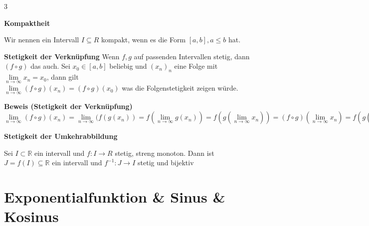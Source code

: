 \documentclass[25pt]{sciposter}
\newcommand{\R}{\mathbb{R}}
\newenvironment{method}[1]{\begin{mdframed}[backgroundcolor=blue!10,innertopmargin=15pt, innerbottommargin=15pt, nobreak=true]
		\textbf{#1 }
	}
	{ 
	\end{mdframed}
}
\begin{document}
\begin{multicols}{3}
\begin{method}{Kompaktheit}
	Wir nennen ein Intervall $I \subseteq R$ kompakt, wenn es die Form $[a,b], a \leq b$ hat.
\end{method}


\begin{method}{Stetigkeit der Verknüpfung} Wenn $f,g$ auf passenden Intervallen stetig, dann $(f \circ g)$ das auch. Sei $x_0 \in [a,b]$ beliebig und $(x_n)_n$ eine Folge mit $\lim\limits_{n\to\infty} x_n = x_0$, dann gilt\\ $\lim\limits_{n\to\infty} (f \circ g) (x_n) = (f \circ g) (x_0)$ was die Folgenstetigkeit zeigen würde.
\end{method}

\textbf{Beweis (Stetigkeit der Verknüpfung)}
$\lim\limits_{n\to\infty} (f\circ g)(x_n) = \lim\limits_{n\to\infty} (f(g(x_n))  = f(\lim\limits_{n\to\infty} g(x_n)) = f(g( \lim\limits_{n\to\infty} x_n))  = (f \circ g) (\lim\limits_{n\to\infty} x_n) = f(g( \lim\limits_{n\to\infty} x_n))  = (f \circ g) (x_0)$



\begin{method}{Stetigkeit der Umkehrabbildung}
	Sei $I \subset \R$ ein intervall und $f:I \to R$ stetig, streng monoton. Dann ist $J = f(I) \subseteq \R$ ein intervall und $f^{-1} : J \to I$ stetig und bijektiv
\end{method}

\vfill\null
\columnbreak

\section*{Exponentialfunktion \& Sinus \& Kosinus}


\end{multicols}
\end{document}
